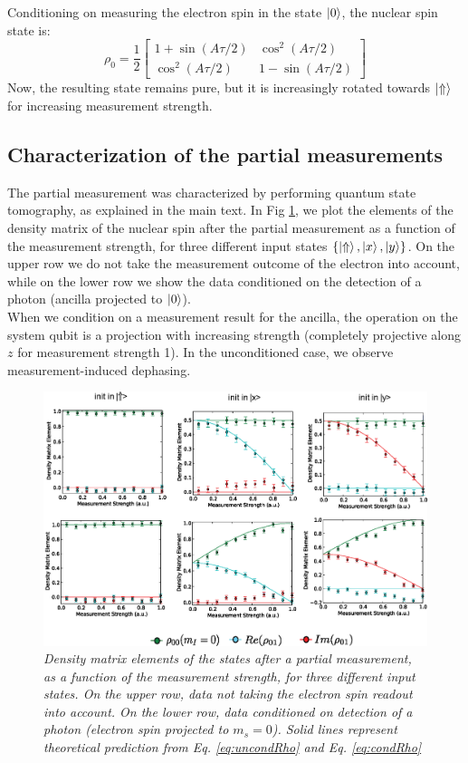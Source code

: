  Conditioning on measuring the electron spin in the state $\left|0\right>$, the nuclear spin state is:
\begin{equation}
 \rho_0 = \frac{1}{2}
 \left[
\begin{array}{cc}
1+\sin ( A \tau/2) & \cos^2 ( A \tau/2)\\
\cos^2 ( A \tau/2) & 1-\sin(A \tau/2)
 \end{array}
 \right]
 \label{eq:condRho}
\end{equation}
Now, the resulting state remains pure, but it is increasingly rotated towards $\left|\Uparrow\right>$ for increasing measurement strength. 

\subsection{Characterization of the partial measurements}
The partial measurement was characterized by performing quantum state tomography, as explained in the main text. In Fig \ref{fig:backaction}, we plot the elements of the density matrix of the nuclear spin after the partial measurement as a function of the measurement strength, for three different input states $\{ \left|\Uparrow\right>, \left|x\right>, \left|y\right> \}$. On the upper row we do not take the measurement outcome of the electron into account, while on the lower row we show the data conditioned on the detection of a photon (ancilla projected to $\left|0\right>$).\\
When we condition on a measurement result for the ancilla, the operation on the system qubit is a projection with increasing strength (completely projective along $z$ for measurement strength 1). In the unconditioned case, we observe measurement-induced dephasing.

\begin{figure} 
\includegraphics [width = 12 cm]{SOM/fig04_backAction.eps}
\caption{\textit{Density matrix elements of the states after a partial measurement, as a function of the measurement strength, for three different input states. On the upper row, data not taking the electron spin readout into account. On the lower row, data conditioned on detection of a photon (electron spin projected to $m_s = 0$). Solid lines represent theoretical prediction from Eq. \ref{eq:uncondRho} and Eq. \ref{eq:condRho}}}
\label{fig:backaction}
\end{figure} 


